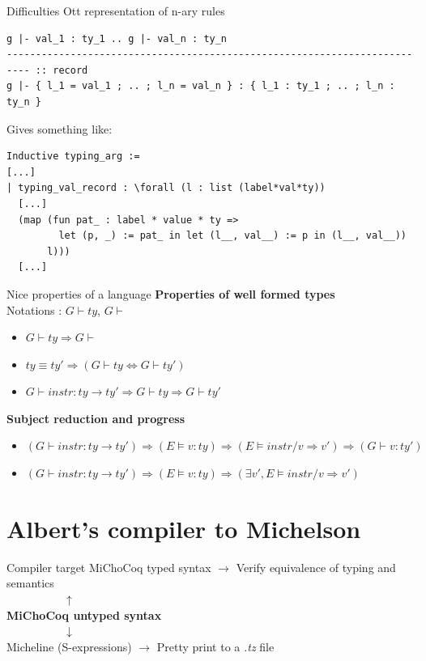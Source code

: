 \documentclass[aspectratio=169]{beamer}
\begin{document}
\begin{frame}[fragile]{Difficulties}
  Ott representation of n-ary rules
  {\footnotesize
\begin{verbatim}
g |- val_1 : ty_1 .. g |- val_n : ty_n
-------------------------------------------------------------------------- :: record
g |- { l_1 = val_1 ; .. ; l_n = val_n } : { l_1 : ty_1 ; .. ; l_n : ty_n }
\end{verbatim}}
Gives something like:
\begin{lstlisting}[language=Coq]
Inductive typing_arg :=
[...]
| typing_val_record : \forall (l : list (label*val*ty))
  [...]
  (map (fun pat_ : label * value * ty =>
         let (p, _) := pat_ in let (l__, val__) := p in (l__, val__))
       l)))
  [...]
\end{lstlisting}
\end{frame}

\begin{frame}{Nice properties of a language}
  \textbf{Properties of well formed types}\\
  Notations : $G \vdash ty$, $G \vdash$\\
  \begin{itemize}
    \item $G \vdash ty \Rightarrow G \vdash$
    \item $ty \equiv ty' \Rightarrow (G \vdash ty \Leftrightarrow G \vdash ty')$
    \item $G \vdash instr : ty \rightarrow ty' \Rightarrow G \vdash ty \Rightarrow G \vdash ty'$
  \end{itemize}

  \textbf{Subject reduction and progress}\\
  \begin{itemize}
    \item $(G \vdash instr : ty \rightarrow ty') \Rightarrow (E \models v : ty) \Rightarrow (E \models instr / v \Rightarrow v') \Rightarrow (G \vdash v : ty')$
    \item $(G \vdash instr : ty \rightarrow ty') \Rightarrow (E \models v : ty) \Rightarrow (\exists v', E \models instr / v \Rightarrow v')$
  \end{itemize}
\end{frame}

\section{Albert's compiler to Michelson}

\begin{frame}{Compiler target}
  MiChoCoq typed syntax $\rightarrow$ Verify equivalence of typing and semantics \\
  $\mspace{90mu} \uparrow $ \\
  \textbf{MiChoCoq untyped syntax} \\
  $\mspace{90mu} \downarrow $ \\
  Micheline (S-expressions) $\rightarrow$ Pretty print to a \textit{.tz} file
\end{frame}
\end{document}
